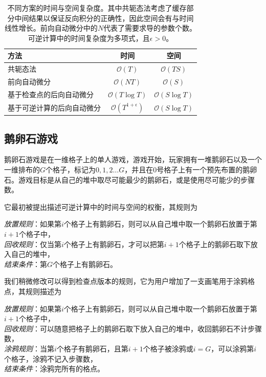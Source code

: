 \documentclass[A4,twoside,fontset=ubuntu,UTF8]{ctexart}
\newcommand{\bigO}{{\mathcal{O}}}
\begin{document}

\begin{table}\centering
    \begin{tabularx}{0.7\textwidth}{Xcc}\toprule
        \textbf{方法} & 时间 & 空间\\
        \hline
        共轭态法                     &  $\bigO(T)$          & $\bigO(TS)$\\
        前向自动微分                 &  $\bigO(NT)$         & $\bigO(S)$  \\
        基于检查点的后向自动微分     &  $\bigO(T\log T)$    & $\bigO(S\log T)$   \\
        基于可逆计算的后向自动微分   &  $\bigO(T^{1+\epsilon})$ & $\bigO(S\log T)$ \\
        \bottomrule
    \end{tabularx}
    \caption{不同方案的时间与空间复杂度。其中共轭态法考虑了缓存部分中间结果以保证反向积分的正确性，因此空间会有与时间线性增长。前向自动微分中的$N$代表了需要求导的参数个数。可逆计算中的时间复杂度为多项式，且$\epsilon > 0$。}\label{tbl:complexity}
\end{table}

\subsection{鹅卵石游戏}
鹅卵石游戏是在一维格子上的单人游戏，游戏开始，玩家拥有一堆鹅卵石以及一个一维排布的$G$个格子，标记为$0,1,2\ldots G$，并且在$0$号格子上有一个预先布置的鹅卵石。游戏目标是从自己的堆中取尽可能最少的鹅卵石，或是使用尽可能少的步骤数。

它最初被提出描述可逆计算中的时间与空间的权衡，其规则为
\begin{tcolorbox}[width=\textwidth, title=鹅卵石游戏-可逆计算版本]
    \textit{放置规则}：如果第$i$个格子上有鹅卵石，则可以从自己堆中取一个鹅卵石放置于第$i+1$个格子中，\\
    \textit{回收规则}：仅当第$i$个格子上有鹅卵石，才可以把第$i+1$个格子上的鹅卵石取下放入自己的堆中，\\
    \textit{结束条件}：第$G$个格子上有鹅卵石。
\end{tcolorbox}

我们稍微修改可以得到检查点版本的规则，它为用户增加了一支画笔用于涂鸦格点，其规则描述为
\begin{tcolorbox}[width=\textwidth, title=鹅卵石游戏-检查点版本]
    \textit{放置规则}：如果第$i$个格子上有鹅卵石，则可以从自己堆中取一个鹅卵石放置于第$i+1$个格子中，\\
    \textit{回收规则}：可以随意把格子上的鹅卵石取下放入自己的堆中，收回鹅卵石不计步骤数，\\
    \textit{涂鸦规则}：当第$i$个格子有鹅卵石，且第$i+1$个格子被涂鸦或$i=G$，可以涂鸦第$i$个格子，涂鸦不记入步骤数，\\
    \textit{结束条件}：涂鸦完所有的格点。
\end{tcolorbox}
\end{document}
